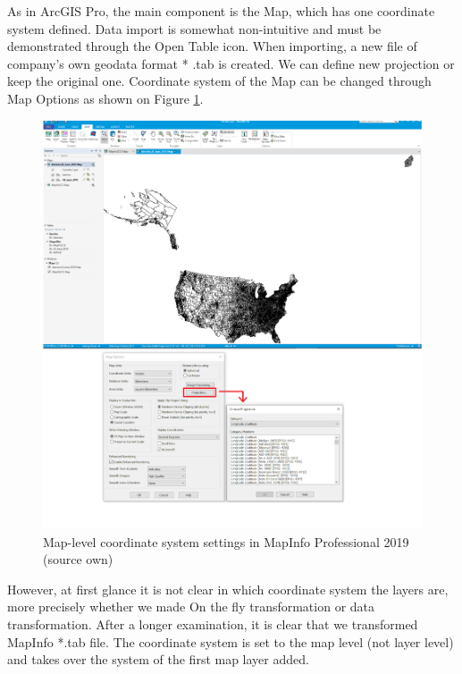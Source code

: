 \documentclass[a4paper,10pt,twoside]{article}
\begin{document}
\noindent As in ArcGIS Pro, the main component is the Map, which has one coordinate system defined. Data import is somewhat non-intuitive and must be demonstrated through the Open Table icon. When importing, a new file of company's own geodata format * .tab is created. We can define new projection or keep the original one. Coordinate system of the Map can be changed through Map Options as shown on Figure \ref{fig:map_info_startup_projection}. 

\vspace{0.3cm}
\begin{figure}[hbt!] 
\begin{center}
\includegraphics[width=16cm]{../pictures/map_info.PNG} 
\caption[Map-level coordinate system settings in MapInfo Professional 2019 (source own)]{Map-level coordinate system settings in MapInfo Professional 2019 (source own)}
\label{fig:map_info_startup_projection}
\end{center}
\end{figure}

\noindent However, at first glance it is not clear in which coordinate system the layers are, more precisely whether we made On the fly transformation or data transformation. After a longer examination, it is clear that we transformed MapInfo *.tab file. The coordinate system is set to the map level (not layer level) and takes over the system of the first map layer added. 
\end{document}
